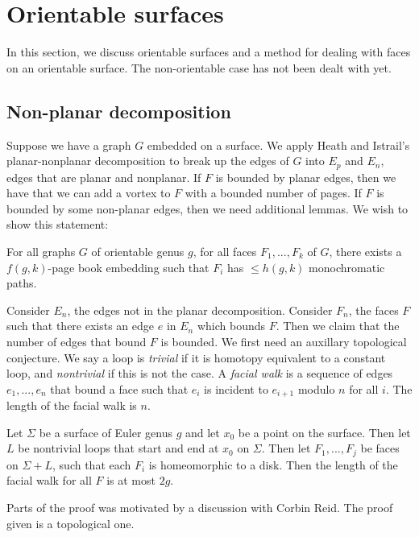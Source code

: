 \section{Orientable surfaces}
In this section, we discuss orientable surfaces and a method for dealing with faces on an orientable surface. The non-orientable case has not been dealt with yet. 
\subsection{Non-planar decomposition}
Suppose we have a graph $G$ embedded on a surface. We apply Heath and Istrail's planar-nonplanar decomposition \cite{heathPagenumberGenusGraphs1992} to break up the edges of $G$ into $E_p$ and $E_n$, edges that are planar and nonplanar. If $F$ is bounded by planar edges, then we have that we can add a vortex to $F$ with a bounded number of pages. If $F$ is bounded by some non-planar edges, then we need additional lemmas.
We wish to show this statement:
\begin{theorem}
	For all graphs $G$ of orientable genus $g$, for all faces $F_1, ..., F_k$ of $G$, there exists a $f(g, k)$-page book embedding such that $F_i$ has $\leq h(g, k)$ monochromatic paths.
\end{theorem}

Consider $E_n$, the edges not in the planar decomposition. Consider $F_n$, the faces $F$ such that there exists an edge $e$ in $E_n$ which bounds $F$. Then we claim that the number of edges that bound $F$ is bounded. We first need an auxillary topological conjecture. We say a loop is \textit{trivial} if it is homotopy equivalent to a constant loop, and \textit{nontrivial} if this is not the case. A \textit{facial walk} is a sequence of edges $e_1, ..., e_n$ that bound a face such that $e_i$ is incident to $e_{i + 1}$ modulo $n$ for all $i$. The length of the facial walk is $n$. 

\begin{lemma}
	Let $\Sigma$ be a surface of Euler genus $g$ and let $x_0$ be a point on the surface. Then let $L$ be nontrivial loops that start and end at $x_0$ on $\Sigma$. Then let $F_1, ..., F_j$ be faces on $\Sigma + L$, such that each $F_i$ is homeomorphic to a disk. Then the length of the facial walk for all $F$ is at most $2g$. 
\end{lemma}

Parts of the proof was motivated by a discussion with Corbin Reid. The proof given is a topological one. 

